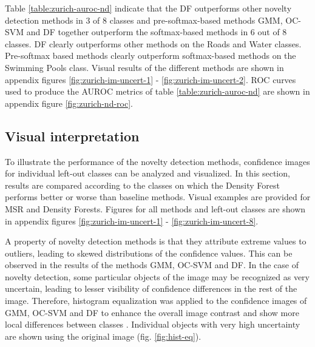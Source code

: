 \documentclass[10pt]{article}
\begin{document}
Table \ref{table:zurich-auroc-nd} indicate that the \gls{DF} outperforms other novelty detection methods in 3 of 8 classes and pre-softmax-based methods \gls{GMM}, \gls{OC-SVM} and \gls{DF} together outperform the softmax-based methods in 6 out of 8 classes. \gls{DF} clearly outperforms other methods on the Roads and Water classes. Pre-softmax based methods clearly outperform softmax-based methods on the Swimming Pools class. Visual results of the different methods are shown in appendix figures \ref{fig:zurich-im-uncert-1} - \ref{fig:zurich-im-uncert-2}. \gls{ROC} curves used to produce the \gls{AUROC} metrics of table \ref{table:zurich-auroc-nd} are shown in appendix figure \ref{fig:zurich-nd-roc}.

\subsection{Visual interpretation}

To illustrate the performance of the novelty detection methods, confidence images for individual left-out classes can be analyzed and visualized. In this section, results are compared according to the classes on which the Density Forest performs better or worse than baseline methods. Visual examples are provided for MSR and Density Forests. Figures for all methods and left-out classes are shown in appendix figures \ref{fig:zurich-im-uncert-1} - \ref{fig:zurich-im-uncert-8}.

A property of novelty detection methods is that they attribute extreme values to outliers, leading to skewed distributions of the confidence values. This can be observed in the results of the methods \gls{GMM}, \gls{OC-SVM} and \gls{DF}. In the case of novelty detection, some particular objects of the image may be recognized as very uncertain, leading to lesser visibility of confidence differences in the rest of the image. Therefore, histogram equalization was applied to the confidence images of \gls{GMM}, \gls{OC-SVM} and \gls{DF} to enhance the overall image contrast and show more local differences between classes \cite{Gonzlez2012DigitalIP}. Individual objects with very high uncertainty are shown using the original image (fig.  \ref{fig:hist-eq}).
\end{document}
